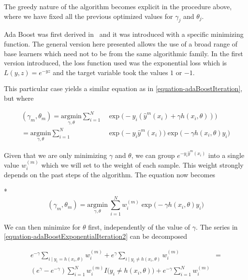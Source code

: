 The greedy nature of the algorithm becomes explicit in the procedure above, where we have fixed all the previous optimized values for $\gamma_j$ and $\theta_j$.

Ada Boost was first derived in~\textcite{schapire-adaBoost} and it was introduced with a specific minimizing function. The general version here presented allows the use of a broad range of base learners which need not to be from the same algorithmic family. In the first version introduced, the loss function used was the exponential loss which is $L(y,z) = e^{-yz}$ and the target variable took the values $1$ or $-1$.

This particular case yields a similar equation as in \cref{equation-adaBoostIteration}, but where

\begin{equation}\label{equation-adaBoostExponentialIteration}
\begin{split}
(\gamma_{m}, \theta_{m}) = \underset{\gamma, \theta}{\mathrm{argmin}} \sum_{i=1}^{N} & \exp\big( -y_i (\hat{y}^{m}(x_i) + \gamma h(x_i,\theta) )\big) \\
= \underset{\gamma, \theta}{\mathrm{argmin}} \sum_{i=1}^{N} &
\exp\big( -y_i \hat{y}^{m}(x_i)\big) \exp\big(- \gamma h(x_i,\theta)y_i \big)
\end{split}
\end{equation}


Given that we are only minimizing $\gamma$ and $\theta$, we can group $e^{-y_i \hat{y}^{m}(x_i)}$ into a single value $w_i^{(m)}$ which we will set to the weight of each sample. This weight strongly depends on the past steps of the algorithm. The equation now becomes

*
\begin{equation}\label{equation-adaBoostExponentialIteration2}
(\gamma_{m}, \theta_{m}) = \underset{\gamma, \theta}{\mathrm{argmin}} \  \sum_{i=1}^{N} w_i^{(m)} \exp \big(-\gamma h(x_i,\theta)y_i \big)
\end{equation}

We can then minimize for $\theta$ first, independently of the value of $\gamma$. The series in \cref{equation-adaBoostExponentialIteration2} can be decomposed

\begin{equation}\label{equation-adaBoostThetaDecomposition}
\begin{split}
e^{-\gamma} \sum_{i \mid y_i = h(x_i,\theta)} w_i^{(m)} + e^{\gamma} \sum_{i \mid y_i \neq h(x_i,\theta)} w_i^{(m)} & = \\
( e^{\gamma} - e^{-\gamma}) \sum_{i = 1}^{N} w_i^{(m)} I \big( y_i \neq h(x_i,\theta)  \big) + e^{-\gamma} \sum_{i = 1}^{N}  w_i^{(m)} &
\end{split}
\end{equation}


